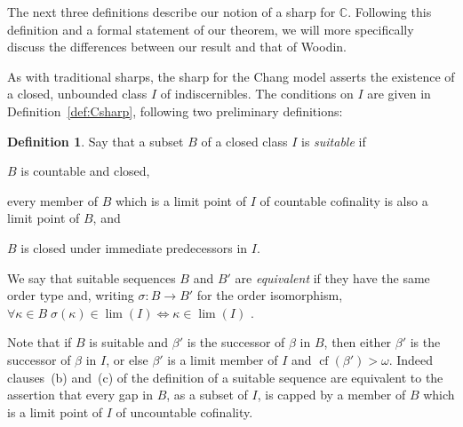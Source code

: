 \documentclass[
twoside,
]{article}
\theoremstyle{definition}
\newtheorem{definition}[theorem]{Definition}
\theoremstyle{remark}
\DeclareMathOperator{\cof}{cf}
\newcommand\chang{\mathbb{C}}
\begin{document}
The next three definitions describe our notion of a sharp for $\chang$.
Following this definition and a formal statement of our theorem, we
will more specifically discuss the differences between our result and
that of Woodin.

As with traditional sharps, the sharp for the Chang model asserts the
existence of a closed, unbounded class $I$ of indiscernibles.    
The  conditions on $I$ are given in Definition~\ref{def:Csharp}, following
two preliminary definitions:

\begin{definition}
  \label{def:suitable}
  Say that a subset
  $B$ of  a closed class $I$ is \emph{suitable} if
  \begin{inparaenum}[(a)]\item
    $B$ is countable and closed,
  \item  every member of $B$ which is a
    limit point of $I$ of countable cofinality is also a limit point
    of $B$, and
  \item $B$ is  closed under  immediate predecessors in $I$.
  \end{inparaenum}

  We say that suitable sequences  $B$ and $B'$ are \emph{equivalent} if they
  have the same order type and, writing $\sigma\colon B\to B'$  for the order isomorphism, 
  $\forall\kappa\in B\; \sigma(\kappa)\in\lim(I)\iff\kappa\in\lim(I)$ . 
\end{definition}

Note that if $B$ is suitable and $\beta'$ is the successor of  $\beta$ in $B$, then
either $\beta'$ is the successor of $\beta$ in $I$, or else $\beta'$ is a limit
member of $I$ and $\cof(\beta')>\omega$.
Indeed clauses~(b) and~(c)
of the definition of a suitable sequence are equivalent to the
assertion that every gap in $B$, as a subset of $I$, is capped by a
member of $B$ which is a limit point of $I$ of uncountable cofinality.
\end{document}

